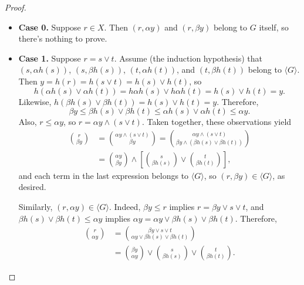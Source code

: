 \begin{proof}
\begin{itemize}
  \item {\bf Case 0.} Suppose $r \in X$. Then $(r,\alpha y)$ and $(r,\beta y)$ 
  belong to $G$ itself, so there's nothing to prove.  

  \item {\bf Case 1.} Suppose $r = s \vee t$. Assume (the induction hypothesis) 
  that $(s, \alpha {h(s)})$, $(s, \beta{h(s)})$, $(t, \alpha {h(t)})$, and 
  $(t, \beta{h(t)})$ belong to $\langle G \rangle$. Then 
  $y = h (r) = h(s\vee t) = h (s)\vee h(t)$, so 
  \[
  h(\alpha {h(s)} \vee \alpha {h(t)})= h\alpha h(s) \vee h\alpha h(t)=
  h(s) \vee h(t) = y.
  \]
  Likewise, $h(\beta{h(s)} \vee \beta {h(t)})= h(s) \vee h(t) = y$.
  Therefore, 
  \[
  \beta y \leqslant \beta h(s) \vee \beta h(t) \leqslant \alpha {h(s)} 
  \vee \alpha {h(t)} \leqslant \alpha y.
  \]
  Also, $r \leqslant \alpha y$, so $r = \alpha y \wedge (s\vee t)$.  Taken 
  together, these observations yield
  \begin{align}
\binom{r}{\beta y}
    &=
      \binom{\alpha y \wedge (s\vee t)}{
              \beta y}
= \binom{\alpha y \wedge (s\vee t)}{
            \beta y \wedge (\beta {h(s)} \vee \beta {h(t)}) 
        }
      \nonumber\\
    &=\binom{\alpha y}{\beta y} \wedge 
      \left[\binom{s}{\beta {h(s)}} \vee \binom{t}{ \beta {h(t)} } \right], \nonumber
  \end{align}
  and each term in the last expression belongs to $\langle G \rangle$, 
  so $(r, \beta y) \in \langle G \rangle$, as desired.

Similarly, $(r, \alpha y) \in \langle G \rangle$.  Indeed, $\beta y \leqslant r$ 
implies $r = \beta y \vee s\vee t$, and 
$\beta {h(s)} \vee \beta {h(t)} \leqslant \alpha y$ implies 
$\alpha y = \alpha y \vee \beta {h(s)} \vee \beta {h(t)}$. Therefore,
\begin{align*}
  \binom{r}{\alpha y}
  &=\binom{\beta y \vee s\vee t}{ \alpha y \vee \beta h(s) \vee \beta {h(t)} }\\
  &=\binom{\beta y}{\alpha y}
 \vee \binom{s}{\beta {h(s)}} \vee 
    \binom{t}{\beta {h(t)} }.
\end{align*}


\end{itemize}
\end{proof}
